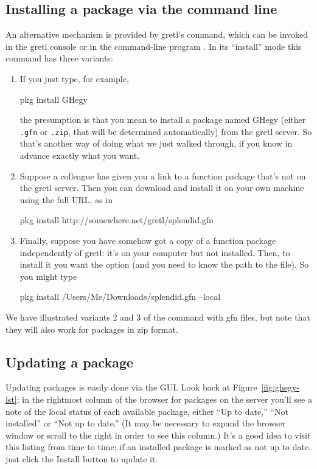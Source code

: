 \documentclass[oneside]{book}
\begin{document}
\subsection{Installing a package via the command line}
\label{sec:cli-install}

An alternative mechanism is provided by gretl's  command,
which can be invoked in the gretl console or in the command-line
program . In its ``install'' mode this command has three
variants:

\begin{enumerate}
\item If you just type, for example,
%
\begin{code}
pkg install GHegy
\end{code}
%
  the presumption is that you mean to install a package named
  \textsf{GHegy} (either \texttt{.gfn} or \texttt{.zip}, that will be
  determined automatically) from the gretl server. So that's another
  way of doing what we just walked through, if you know in advance
  exactly what you want.
\item Suppose a colleague has given you a link to a function package
  that's not on the gretl server. Then you can download and install it
  on your own machine using the full URL, as in
%
\begin{code}
pkg install http://somewhere.net/gretl/splendid.gfn
\end{code}
%
\item Finally, suppose you have somehow got a copy of a function
  package independently of gretl: it's on your computer but not
  installed.  Then, to install it you want the  option
  (and you need to know the path to the file). So you might type
%
\begin{code}
pkg install /Users/Me/Downloads/splendid.gfn --local
\end{code}
%
\end{enumerate}

We have illustrated variants 2 and 3 of the  command
with \textsf{gfn} files, but note that they will also work for
packages in \textsf{zip} format.

\subsection{Updating a package}

Updating packages is easily done via the GUI. Look back at
Figure~\ref{fig:ghegy-lst}: in the rightmost column of the browser for
packages on the server you'll see a note of the local status of each
available package, either ``Up to date,'' ``Not installed'' or ``Not
up to date.'' (It may be necessary to expand the browser window or
scroll to the right in order to see this column.) It's a good idea to
visit this listing from time to time; if an installed package is
marked as not up to date, just click the Install button to update it.
\end{document}
